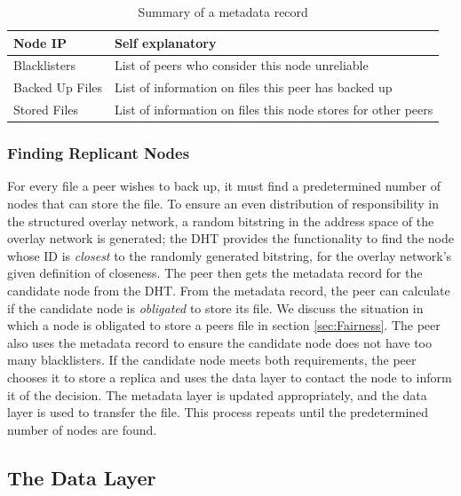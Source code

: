 \documentclass[12pt]{report}
\begin{document}
\begin{table}
\begin{center}
    \begin{tabular}{| l | l |} 
    \hline
    Node IP & Self explanatory \\ \hline
    Blacklisters & List of peers who consider this node unreliable\\ \hline
    Backed Up Files & List of information on files this peer has backed up \\ \hline
    Stored Files & List of information on files this node stores for other peers \\ \hline
    \end{tabular}
    \caption{Summary of a metadata record}
    \label{tab:metadataRecord}
\end{center}
\end{table}

\subsubsection{Finding Replicant Nodes} \label{subsubsec:FindingReplicantNodes}

For every file a peer wishes to back up, it must find a predetermined number of nodes that can store the file. To ensure an even distribution of responsibility in the structured overlay network, a random bitstring in the address space of the overlay network is generated; the DHT provides the functionality to find the node whose ID is \textit{closest} to the randomly generated bitstring, for the overlay network's given definition of closeness. The peer then gets the metadata record for the candidate node from the DHT. From the metadata record, the peer can calculate if the candidate node is \textit{obligated} to store its file. We discuss the situation in which a node is obligated to store a peers file in section \ref{sec:Fairness}. The peer also uses the metadata record to ensure the candidate node does not have too many blacklisters. If the candidate node meets both requirements, the peer chooses it to store a replica and uses the data layer to contact the node to inform it of the decision. The metadata layer is updated appropriately, and the data layer is used to transfer the file. This process repeats until the predetermined number of nodes are found.

\subsection{The Data Layer} \label{subsec:TheDataLayer}
\end{document}

